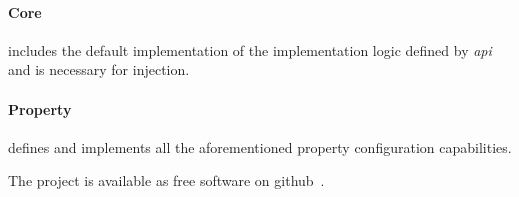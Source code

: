 	\paragraph{Core} includes the default implementation of the implementation logic defined by \emph{api} and is necessary for injection.
	
	\paragraph{Property} defines and implements all the aforementioned property configuration capabilities.
	
	The project is available as free software on github~\cite{Kreator}.	
	
%













